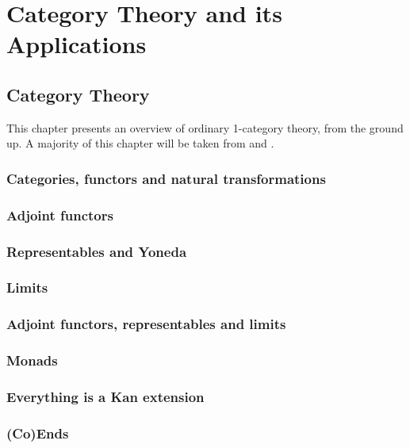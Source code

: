 \documentclass[12pt]{report}
\theoremstyle{definition}
\begin{document}
\part{Category Theory and its Applications}\label{part:category-theory-its}

\chapter{Category Theory}\label{cha:category-theory}
This chapter presents an overview of ordinary 1-category theory, from the ground up. A majority of this chapter will be taken from \cite{Leinster:Basic_Category_Theory} and \cite{riehl2016category}.

\section{Categories, functors and natural transformations}

\section{Adjoint functors}

\section{Representables and Yoneda}

\section{Limits}

\section{Adjoint functors, representables and limits}

\section{Monads}

\section{Everything is a Kan extension}

\section{(Co)Ends}
\end{document}
